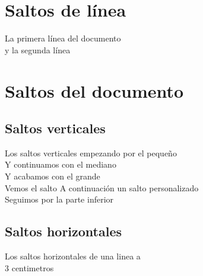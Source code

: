\documentclass[10pt,a4paper]{book}
\begin{document}
\chapter{Saltos de línea}
La primera línea del documento \\
y la segunda línea
\chapter{Saltos del documento}
\section{Saltos verticales}
Los saltos verticales empezando por el pequeño
\smallskip \\
Y continuamos con el mediano
\medskip \\
Y acabamos con el grande
\bigskip \\
Vemos  el salto 
A continuación un salto personalizado
\vspace{5cm} \\
Seguimos por la parte inferior
\section{Saltos horizontales}
Los saltos horizontales de una linea
a \hspace{3cm} \\ 3 centimetros 
\end{document}
